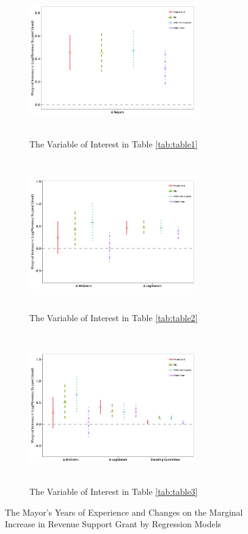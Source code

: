 
\begin{figure}[!htbp]
    \centering
    \begin{subfigure}[t]{0.45\textwidth}
    \includegraphics[width=7.2cm, height=6.5cm]{04-Chapter-Four/image/figure7-coef-table1.jpeg}
    \caption{The Variable of Interest in Table \ref{tab:table1}}
    \label{fig:margin-1}    
    \end{subfigure}    
    \begin{subfigure}[t]{0.45\textwidth}
    \includegraphics[width=7.2cm, height=6.5cm]{04-Chapter-Four/image/figure7-coef-table2.jpeg}
    \caption{The Variable of Interest in Table \ref{tab:table2}} 
    \label{fig:margin-2}
    \end{subfigure}
    \raggedright
    \begin{subfigure}[t]{0.45\textwidth}
    \includegraphics[width=7.2cm, height=6.5cm]{04-Chapter-Four/image/figure7-coef-table3.jpeg}
    \caption{The Variable of Interest in Table \ref{tab:table3}} 
    \label{fig:margin-3}
    \end{subfigure}    
    \caption{The Mayor\textquoteright s Years of Experience and Changes on the Marginal Increase in Revenue Support Grant by Regression Models\label{figure7}}
    \label{fig:margin-model}    
\end{figure}

